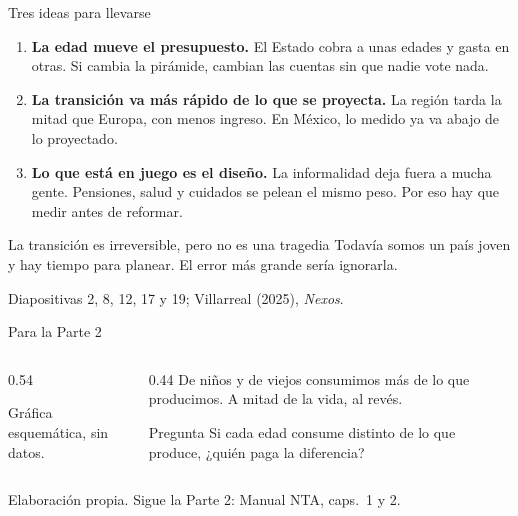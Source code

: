 \documentclass[aspectratio=169,11pt]{beamer}
\newcommand{\fuente}[1]{\par\vfill{\small\color{cGris}#1\par}}
\begin{document}
\begin{frame}{Tres ideas para llevarse}
  \begin{enumerate}
    \item \textbf{La edad mueve el presupuesto.} El Estado cobra a unas edades y gasta en otras. Si cambia la pirámide, cambian las cuentas sin que nadie vote nada.
    \pause
    \item \textbf{La transición va más rápido de lo que se proyecta.} La región tarda la mitad que Europa, con menos ingreso. En México, lo medido ya va abajo de lo proyectado.
    \pause
    \item \textbf{Lo que está en juego es el diseño.} La informalidad deja fuera a mucha gente. Pensiones, salud y cuidados se pelean el mismo peso. Por eso hay que medir antes de reformar.
  \end{enumerate}
  \pause
  \begin{block}{La transición es irreversible, pero no es una tragedia}
    Todavía somos un país joven y hay tiempo para planear. El error más grande sería ignorarla.
  \end{block}
  \fuente{Diapositivas 2, 8, 12, 17 y 19; Villarreal (2025), \emph{Nexos}.}
\end{frame}

\begin{frame}{Para la Parte 2}
  \begin{columns}[T]
    \begin{column}{0.54\textwidth}
      \centering
      {\small\color{cGris}Gráfica esquemática, sin datos.}
    \end{column}
    \begin{column}{0.44\textwidth}
      De niños y de viejos consumimos más de lo que producimos. A mitad de la vida, al revés.
      \pause
      \begin{alertblock}{Pregunta}
        Si cada edad consume distinto de lo que produce, ¿quién paga la diferencia?
      \end{alertblock}
    \end{column}
  \end{columns}
  \fuente{Elaboración propia. Sigue la Parte 2: Manual NTA, caps.~1 y 2.}
\end{frame}
\end{document}
